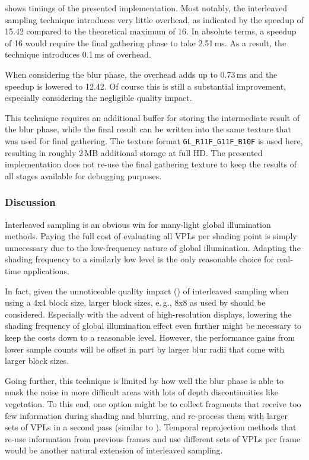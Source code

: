  shows timings of the presented implementation. Most notably, the interleaved sampling technique introduces very little overhead, as indicated by the speedup of 15.42 compared to the theoretical maximum of 16. In absolute terms, a speedup of 16 would require the final gathering phase to take 2.51\,ms. As a result, the technique introduces 0.1\,ms of overhead.

When considering the blur phase, the overhead adds up to 0.73\,ms and the speedup is lowered to 12.42. Of course this is still a substantial improvement, especially considering the negligible quality impact.

This technique requires an additional buffer for storing the intermediate result of the blur phase, while the final result can be written into the same texture that was used for final gathering. The texture format \texttt{GL\_R11F\_G11F\_B10F} is used here, resulting in roughly 2\,MB additional storage at full HD. The presented implementation does not re-use the final gathering texture to keep the results of all stages available for debugging purposes.


\subsubsection{Discussion}
Interleaved sampling is an obvious win for many-light global illumination methods. Paying the full cost of evaluating all VPLs per shading point is simply unnecessary due to the low-frequency nature of global illumination. Adapting the shading frequency to a similarly low level is the only reasonable choice for real-time applications.

In fact, given the unnoticeable quality impact () of interleaved sampling when using a 4x4 block size, larger block sizes, e.\,g., 8x8 as used by \citet{hedman2016sequential} should be considered. Especially with the advent of high-resolution displays, lowering the shading frequency of global illumination effect even further might be necessary to keep the costs down to a reasonable level. However, the performance gains from lower sample counts will be offset in part by larger blur radii that come with larger block sizes.

Going further, this technique is limited by how well the blur phase is able to mask the noise in more difficult areas with lots of depth discontinuities like vegetation. To this end, one option might be to collect fragments that receive too few information during shading and blurring, and re-process them with larger sets of VPLs in a second pass (similar to \cite{Lauritzen:2010:Deferred}). Temporal reprojection methods \citep{Jimenez:2016:FilmicSMAA} that re-use information from previous frames and use different sets of VPLs per frame would be another natural extension of interleaved sampling.



